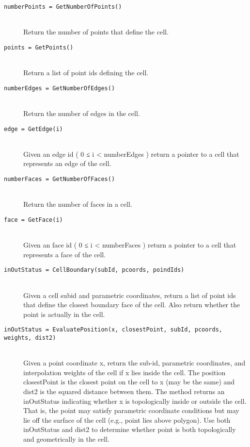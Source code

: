 \begin{description}
\begin{description}
    \item[\texttt{numberPoints = GetNumberOfPoints()}] \hfill \\
    Return the number of points that define the cell.

    \item[\texttt{points = GetPoints()}] \hfill \\
    Return a list of point ids defining the cell.

    \item[\texttt{numberEdges = GetNumberOfEdges()}] \hfill \\
    Return the number of edges in the cell.

    \item[\texttt{edge = GetEdge(i)}] \hfill \\
    Given an edge id ( 0 ≤ i < numberEdges ) return a pointer to a cell that represents an edge of the cell.

    \item[\texttt{numberFaces = GetNumberOfFaces()}] \hfill \\
    Return the number of faces in a cell.

    \item[\texttt{face = GetFace(i)}] \hfill \\
    Given an face id ( 0 ≤ i < numberFaces ) return a pointer to a cell that represents a face of the cell.

    \item[\texttt{inOutStatus = CellBoundary(subId, pcoords, poindIds)}] \hfill \\
    Given a cell subid and parametric coordinates, return a list of point ids that define the closest boundary face of the cell. Also return whether the point is actually in the cell.

    \item[\texttt{inOutStatus = EvaluatePosition(x, closestPoint, subId, pcoords, weights, dist2)}] \hfill \\
    Given a point coordinate x, return the sub-id, parametric coordinates, and interpolation weights of the cell if x lies inside the cell. The position closestPoint is the closest point on the cell to x (may be the same) and dist2 is the squared distance between them. The method returns an inOutStatus indicating whether x is topologically inside or outside the cell. That is, the point may satisfy parametric coordinate conditions but may lie off the surface of the cell (e.g., point lies above polygon). Use both inOutStatus and dist2 to determine whether point is both topologically and geometrically in the cell.


\end{description}
\end{description}
